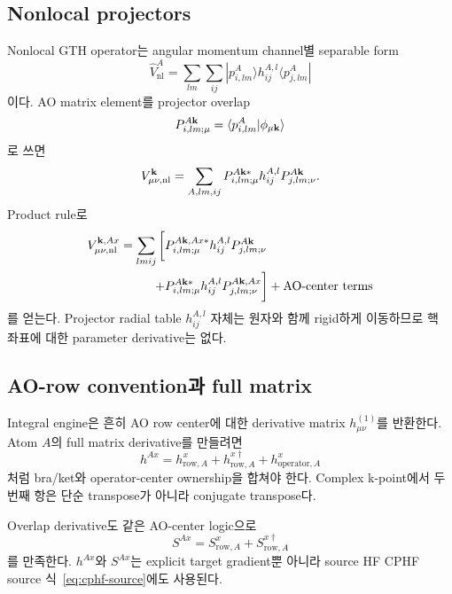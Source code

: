 \subsection{Nonlocal projectors}

Nonlocal GTH operator는 angular momentum channel별 separable form
\begin{equation}
  \hat V_{\mathrm{nl}}^A
  =\sum_{l m}\sum_{ij}
   |p_{i,lm}^{A}\rangle h_{ij}^{A,l}
   \langle p_{j,lm}^{A}|
  \label{eq:gth-nonlocal-operator}
\end{equation}
이다. AO matrix element를 projector overlap
\begin{equation}
  P_{i,lm;\mu}^{A\mathbf{k}}
  =\langle p_{i,lm}^{A}|\phi_{\mu\mathbf{k}}\rangle
  \label{eq:gth-projector-overlap}
\end{equation}
로 쓰면
\begin{equation}
  V_{\mu\nu,\mathrm{nl}}^{\mathbf{k}}
  =\sum_{A,lm,ij}
   P_{i,lm;\mu}^{A\mathbf{k} *}h_{ij}^{A,l}
   P_{j,lm;\nu}^{A\mathbf{k}}.
  \label{eq:gth-nonlocal-matrix}
\end{equation}
Product rule로
\begin{align}
  V_{\mu\nu,\mathrm{nl}}^{\mathbf{k},Ax}
  =\sum_{l m i j}
  \bigg[&P_{i,lm;\mu}^{A\mathbf{k},Ax *}h_{ij}^{A,l}
         P_{j,lm;\nu}^{A\mathbf{k}}
  \notag\\
       +&P_{i,lm;\mu}^{A\mathbf{k} *}h_{ij}^{A,l}
         P_{j,lm;\nu}^{A\mathbf{k},Ax}\bigg]
  +\text{AO-center terms}
  \label{eq:gth-nonlocal-derivative}
\end{align}
를 얻는다. Projector radial table $h_{ij}^{A,l}$ 자체는 원자와 함께 rigid하게 이동하므로
핵 좌표에 대한 parameter derivative는 없다.

\subsection{AO-row convention과 full matrix}

Integral engine은 흔히 AO row center에 대한 derivative matrix
$h_{\mu\nu}^{(1)}$를 반환한다. Atom $A$의 full matrix derivative를 만들려면
\begin{equation}
  h^{Ax}=h_{\mathrm{row},A}^{x}
       +h_{\mathrm{row},A}^{x\dagger}
       +h_{\mathrm{operator},A}^{x}
  \label{eq:hcore-full-derivative}
\end{equation}
처럼 bra/ket와 operator-center ownership을 합쳐야 한다. Complex k-point에서 두 번째
항은 단순 transpose가 아니라 conjugate transpose다.

Overlap derivative도 같은 AO-center logic으로
\begin{equation}
  S^{Ax}=S_{\mathrm{row},A}^{x}+S_{\mathrm{row},A}^{x\dagger}
  \label{eq:overlap-full-derivative}
\end{equation}
를 만족한다. $h^{Ax}$와 $S^{Ax}$는 explicit target gradient뿐 아니라 source HF CPHF
source 식~\eqref{eq:cphf-source}에도 사용된다.

